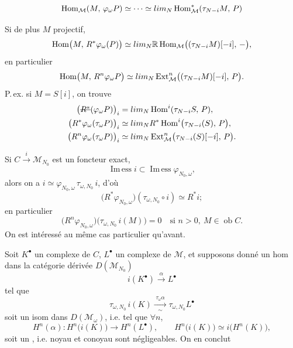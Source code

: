 \documentclass[11pt,a4paper]{article}
\begin{document}
\[
\operatorname{Hom}_{\mathcal{M}}(M,\,\varphi_\omega P) \simeq \dots \simeq \varinjlim_N \operatorname{Hom}^{*}_{\mathcal{M}}(\tau_{N-i}M,\,P)
\]

Si de plus $M$ projectif,
\[
\operatorname{Hom}\bigl(M,\,R^{*}\varphi_\omega(P)\bigr) \simeq \varinjlim_N \mathbb{R}\operatorname{Hom}_{\mathcal{M}}\bigl((\tau_{N-i}M)[-i],\,-\bigr),
\]
en particulier
\[
\operatorname{Hom}\bigl(M,\,R^{n}\varphi_\omega P\bigr) \simeq \varinjlim_N \operatorname{Ext}^{n}_{\mathcal{M}}\bigl((\tau_{N-i}M)[-i],\,P\bigr).
\]
P.\,ex. si $M = S[i]$, on trouve
\[
\begin{aligned}
\bigl(\text{\struck{$R^{*}$}}(\varphi_\omega P)\bigr)_i &= \varinjlim_N \operatorname{Hom}^{i}(\tau_{N-i}S,\,P),\\
\bigl(R^{*}\varphi_\omega(\tau_\omega P)\bigr)_i &\simeq \varinjlim_N R^{*}\operatorname{Hom}^{i}\bigl(\tau_{N-i}(S),\,P\bigr),\\
\bigl(R^{n}\varphi_\omega(\tau_\omega P)\bigr)_i &\simeq \varinjlim_N \operatorname{Ext}^{n}_{\mathcal{M}}\bigl(\tau_{N-i}(S)[-i],\,P\bigr).
\end{aligned}
\]

Si $C \xrightarrow{\;i\;} \mathcal{M}_{N_0}$ est un foncteur exact,
\[
\operatorname{Im\,ess} i \subset \operatorname{Im\,ess}\varphi_{N_0,\omega},
\]
alors on a $i \simeq \varphi_{N_0,\omega}\,\tau_{\omega,N_0}\,i$, d'où
\[
\bigl(R^{*}\varphi_{N_0,\omega}\bigr)(\tau_{\omega,N_0}\circ i) \simeq R^{*}i ;
\]
en particulier
\[
\bigl(R^{n}\varphi_{N_0,\omega}\bigr)\bigl(\tau_{\omega,N_0}\,i(M)\bigr) = 0 \quad\text{si } n>0,\ M\in\operatorname{ob}C.
\]
On est intéressé au même cas particulier qu'avant.

Soit $K^{\bullet}$ un complexe de $C$, $L^{\bullet}$ un complexe de $\mathcal{M}$\ill{}, et supposons donné un hom dans la catégorie dérivée $D(\mathcal{M}_{N_0})$
\[
i(K^{\bullet}) \xrightarrow{\;\alpha\;} L^{\bullet}
\]
tel que
\[
\tau_{\omega,N_0}\,i(K) \xrightarrow[\sim]{\;\tau_\omega\alpha\;} \tau_{\omega,N_0}L^{\bullet}
\]
soit un isom dans $D(\mathcal{M}_\omega)$, i.e. tel que $\forall n$,
\[
H^{n}(\alpha) : H^{n}\bigl(i(K)\bigr) \longrightarrow H^{n}(L^{\bullet}),
\qquad H^{n}\bigl(i(K)\bigr) \simeq i\bigl(H^{n}(K)\bigr),
\]
soit un , i.e. noyau et conoyau sont négligeables. On en conclut
\end{document}
